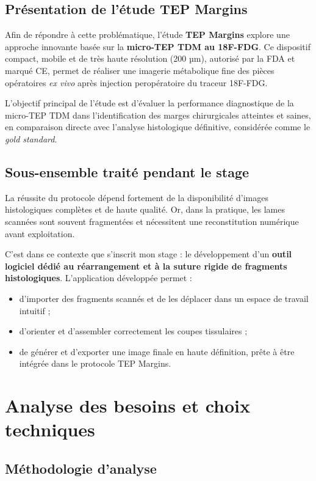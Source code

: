 \documentclass[11pt,a4paper]{report}
\begin{document}
\section{Présentation de l'étude TEP Margins}

Afin de répondre à cette problématique, l'étude \textbf{TEP Margins} explore une approche innovante basée sur la \textbf{micro-TEP TDM au 18F-FDG}. Ce dispositif compact, mobile et de très haute résolution (200 µm), autorisé par la FDA et marqué CE, permet de réaliser une imagerie métabolique fine des pièces opératoires \textit{ex vivo} après injection peropératoire du traceur 18F-FDG.

L'objectif principal de l'étude est d'évaluer la performance diagnostique de la micro-TEP TDM dans l'identification des marges chirurgicales atteintes et saines, en comparaison directe avec l'analyse histologique définitive, considérée comme le \textit{gold standard}.

\section{Sous-ensemble traité pendant le stage}

La réussite du protocole dépend fortement de la disponibilité d'images histologiques complètes et de haute qualité. Or, dans la pratique, les lames scannées sont souvent fragmentées et nécessitent une reconstitution numérique avant exploitation.

C'est dans ce contexte que s'inscrit mon stage : le développement d'un \textbf{outil logiciel dédié au réarrangement et à la suture rigide de fragments histologiques}. L'application développée permet :

\begin{itemize}
\item d'importer des fragments scannés et de les déplacer dans un espace de travail intuitif ;
\item d'orienter et d'assembler correctement les coupes tissulaires ;
\item de générer et d'exporter une image finale en haute définition, prête à être intégrée dans le protocole TEP Margins.
\end{itemize}

\chapter{Analyse des besoins et choix techniques}

\section{Méthodologie d'analyse}
\end{document}
